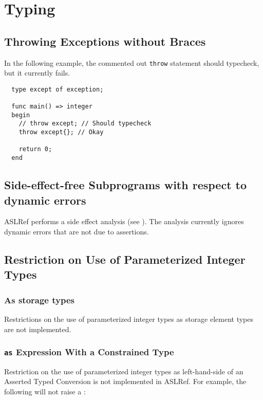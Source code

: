 \section{Typing}

\subsection{Throwing Exceptions without Braces}
In the following example, the commented out \texttt{throw} statement should typecheck,
but it currently fails.

\begin{verbatim}
  type except of exception;

  func main() => integer
  begin
    // throw except; // Should typecheck
    throw except{}; // Okay

    return 0;
  end
\end{verbatim}

\subsection{Side-effect-free Subprograms with respect to dynamic errors}
ASLRef performs a side effect analysis (see ).
The analysis currently ignores dynamic errors that are not due to assertions.

\subsection{Restriction on Use of Parameterized Integer Types}

\subsubsection{As storage types}
Restrictions on the use of parameterized integer types as storage element types are not
implemented.


\subsubsection{\texttt{as} Expression With a Constrained Type}

Restriction on the use of parameterized integer types as left-hand-side of an
Asserted Typed Conversion is not implemented in ASLRef.
%
For example, the following will not raise a \typingerrorterm:

